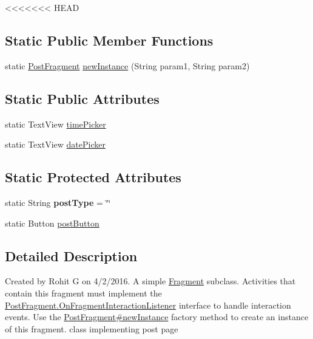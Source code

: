 \begin{DoxyCompactItemize}
\begin{DoxyCompactItemize}
\end{DoxyCompactItemize}
<<<<<<< HEAD
\subsection*{Static Public Member Functions}
\begin{DoxyCompactItemize}
\item 
static \hyperlink{classcom_1_1example_1_1sel_1_1lostfound_1_1PostFragment}{Post\-Fragment} \hyperlink{classcom_1_1example_1_1sel_1_1lostfound_1_1PostFragment_a7350f5b81aa9144d9acdeca902676773}{new\-Instance} (String param1, String param2)
\end{DoxyCompactItemize}
\subsection*{Static Public Attributes}
\begin{DoxyCompactItemize}
\item 
static Text\-View \hyperlink{classcom_1_1example_1_1sel_1_1lostfound_1_1PostFragment_ac6d98a5b689bea76cf1248a20a54d23c}{time\-Picker}
\item 
static Text\-View \hyperlink{classcom_1_1example_1_1sel_1_1lostfound_1_1PostFragment_a1c187b07da5262cf568439018a826ef9}{date\-Picker}
\end{DoxyCompactItemize}
\subsection*{Static Protected Attributes}
\begin{DoxyCompactItemize}
\item 
\hypertarget{classcom_1_1example_1_1sel_1_1lostfound_1_1PostFragment_acb0672afa2382233136ee251bef7149b}{static String {\bfseries post\-Type} = \char`\"{}\char`\"{}}\label{classcom_1_1example_1_1sel_1_1lostfound_1_1PostFragment_acb0672afa2382233136ee251bef7149b}

\item 
static Button \hyperlink{classcom_1_1example_1_1sel_1_1lostfound_1_1PostFragment_ab2d93225b515c22ccd209e1382e1a4a1}{post\-Button}
\end{DoxyCompactItemize}


\subsection{Detailed Description}
Created by Rohit G on 4/2/2016. A simple \hyperlink{}{Fragment} subclass. Activities that contain this fragment must implement the \hyperlink{interfacecom_1_1example_1_1sel_1_1lostfound_1_1PostFragment_1_1OnFragmentInteractionListener}{Post\-Fragment.\-On\-Fragment\-Interaction\-Listener} interface to handle interaction events. Use the \hyperlink{classcom_1_1example_1_1sel_1_1lostfound_1_1PostFragment_a7350f5b81aa9144d9acdeca902676773}{Post\-Fragment\#new\-Instance} factory method to create an instance of this fragment. class implementing post page 


\end{DoxyCompactItemize}
